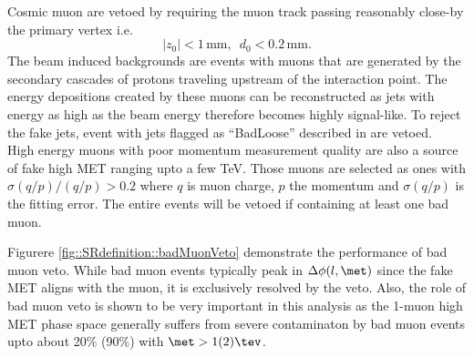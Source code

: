 Cosmic muon are vetoed by requiring the muon track passing reasonably close-by the primary vertex i.e.
$$
|z_0| < 1\, \mathrm{mm}, \,\,\, d_0<0.2\, \mathrm{mm}.
$$
The beam induced backgrounds are events with muons that are generated by the secondary cascades of protons traveling upstream of the interaction point. The energy depositions created by these muons can be reconstructed as jets with energy as high as the beam energy therefore becomes highly signal-like. To reject the fake jets, event with jets flagged as ``BadLoose'' described in \cite{BadJetCriteriaATLAS2015} are vetoed. \\

High energy muons with poor momentum measurement quality are also a source of fake high MET ranging upto a few TeV.
Those muons are selected as ones with $\sigma(q/p) / (q/p) > 0.2$ where $q$ is muon charge, $p$ the momentum and $\sigma(q/p)$ is the fitting error.
The entire events will be vetoed if containing at least one bad muon.


Figurere \ref{fig::SRdefinition::badMuonVeto} demonstrate the performance of bad muon veto. While bad muon events typically peak in $\Delta \phi (l,\met)$ since the fake MET aligns with the muon, it is exclusively resolved by the veto. Also, the role of bad muon veto is shown to be very important in this analysis as the 1-muon high MET phase space generally suffers from severe contaminaton by bad muon events upto about 20$\%$ (90$\%$) with  $\met>1(2)\tev$.  \\

